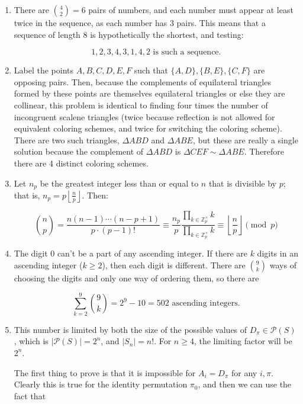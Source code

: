 \documentclass{book}
\numberwithin{equation}{section}
\begin{document}
\begin{enumerate}[label={9.\arabic*}]
\item
There are ${4 \choose 2} = 6$ pairs of numbers, and each number must appear at least twice in the sequence, as
each number has 3 pairs. This means that a sequence of length 8 is hypothetically the shortest, and testing:

$$1, 2, 3, 4, 3, 1, 4, 2 \text{ is such a sequence.}$$

\item
Label the points $A, B, C, D, E, F$ such that $\{A, D\}, \{B, E\}, \{C, F\}$ are opposing pairs. Then, because the complements
of equilateral triangles formed by these points are themselves equilateral triangles or else they are collinear, this problem
is identical to finding four times the number of incongruent scalene triangles (twice because reflection is not allowed
for equivalent coloring schemes, and twice for switching the coloring scheme). There are two such triangles,
$\Delta ABD$ and $\Delta ABE$, but these are really a single solution because the complement of $\Delta ABD$ is
$\Delta CEF \sim \Delta ABE$. Therefore there are 4 distinct coloring schemes.

\item
Let $n_p$ be the greatest integer less than or equal to $n$ that is divisible by $p$; that is, $n_p = p\left\lfloor \frac{n}{p} \right\rfloor$. Then:

$${n \choose p} = \frac{n(n-1)\cdots (n-p+1)}{p\cdot (p-1)!} \equiv \frac{n_p}{p}\frac{\prod_{k \in \mathbb{Z}_p^{\times}} k}{\prod_{k \in \mathbb{Z}_p^{\times}} k} \equiv \left\lfloor \frac{n}{p} \right\rfloor \pmod{p}$$

\item
The digit 0 can't be a part of any ascending integer. If there are $k$ digits in an ascending integer ($k \geq 2$), then
each digit is different. There are ${9 \choose k}$ ways of choosing the digits and only one way of ordering them, so
there are

$$\sum_{k=2}^9 {9 \choose k} = 2^9 - 10 = 502 \text{ ascending integers.}$$

\item
This number is limited by both the size of the possible values of $D_{\pi} \in \mathcal{P}(S)$, which is $|\mathcal{P}(S)| = 2^n$, and $|S_n| = n!$. For $n \geq 4$, the limiting factor will be $2^n$.

The first thing to prove is that it is impossible for $A_i = D_{\pi}$ for any $i, \pi$. Clearly this is true for the identity
permutation $\pi_0$, and then we can use the fact that


\end{enumerate}
\end{document}
